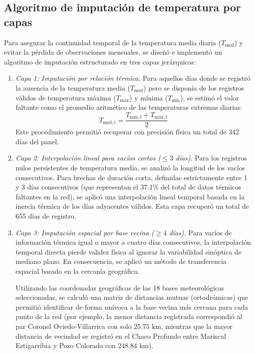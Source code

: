 \subsection{Algoritmo de imputación de temperatura por capas}

Para asegurar la continuidad temporal de la temperatura media diaria ($T_{\text{med}}$) y evitar la pérdida de observaciones mensuales, se diseñó e implementó un algoritmo de imputación estructurado en tres capas jerárquicas:

\begin{enumerate}
    \item \textit{Capa 1: Imputación por relación térmica.} Para aquellos días donde se registró la ausencia de la temperatura media ($T_{\text{med}}$) pero se disponía de los registros válidos de temperatura máxima ($T_{\text{máx}}$) y mínima ($T_{\text{mín}}$), se estimó el valor faltante como el promedio aritmético de las temperaturas extremas diarias:
    \begin{equation}
        T_{\text{med}, t} = \frac{T_{\text{mín}, t} + T_{\text{máx}, t}}{2}
    \end{equation}
    Este procedimiento permitió recuperar con precisión física un total de 342 días del panel.
    \item \textit{Capa 2: Interpolación lineal para vacíos cortos ($\le 3$ días).} Para los registros nulos persistentes de temperatura media, se analizó la longitud de los vacíos consecutivos. Para brechas de duración corta, definidas estrictamente entre 1 y 3 días consecutivos (que representan el 37.1\% del total de datos térmicos faltantes en la red), se aplicó una interpolación lineal temporal basada en la inercia térmica de los días adyacentes válidos. Esta capa recuperó un total de 655 días de registro.
    \item \textit{Capa 3: Imputación espacial por base vecina ($\geq 4$ días).} Para vacíos de información térmica igual o mayor a cuatro días consecutivos, la interpolación temporal directa pierde validez física al ignorar la variabilidad sinóptica de mediano plazo. En consecuencia, se aplicó un método de transferencia espacial basado en la cercanía geográfica. 

Utilizando las coordenadas geográficas de las 18 bases meteorológicas seleccionadas, se calculó una matriz de distancias mutuas (ortodrómicas) que permitió identificar de forma unívoca a la base vecina más cercana para cada punto de la red (por ejemplo, la menor distancia registrada correspondió al par Coronel Oviedo-Villarrica con solo $25.75\text{ km}$, mientras que la mayor distancia de vecindad se registró en el Chaco Profundo entre Mariscal Estigarribia y Pozo Colorado con $248.84\text{ km}$). 


\end{enumerate}
